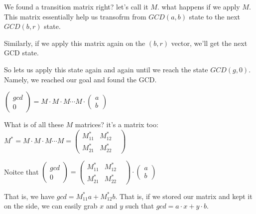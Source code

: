 We found a transition matrix right? let's call it $M$. what happens if we apply $M$. This matrix essentially help us transofrm from $GCD(a,b)$ state to the next $GCD(b,r)$ state.

Similarly, if we apply this matrix again on the $(b,r)$ vector, we'll get the next GCD state.

So lets us apply this state again and again until we reach the state $GCD(g,0)$. Namely, we reached our goal and found the GCD.

$\begin{pmatrix}gcd \\0 \end{pmatrix} = M \cdot M \cdot M \cdots M \cdot \begin{pmatrix} a \\ b \end{pmatrix}$

What is of all these $M$ matrices? it's a matrix too: 
$M^* = M \cdot M \cdot M \cdots M = \begin{pmatrix} M_{11}^*   & M_{12}^* & \\ M_{21}^* & M_{22}^* \end{pmatrix} $

Noitce that 
$\begin{pmatrix}gcd \\0 \end{pmatrix} = \begin{pmatrix} M_{11}^*   & M_{12}^* & \\ M_{21}^* & M_{22}^* \end{pmatrix} \cdot \begin{pmatrix} a \\ b \end{pmatrix}$

That is, we have $gcd=M_{11}^*a + M_{12}^*b$. That is, if we stored our matrix and kept it on the side, we can easily grab $x$ and $y$ such that $gcd=a\cdot x+ y\cdot b$.



